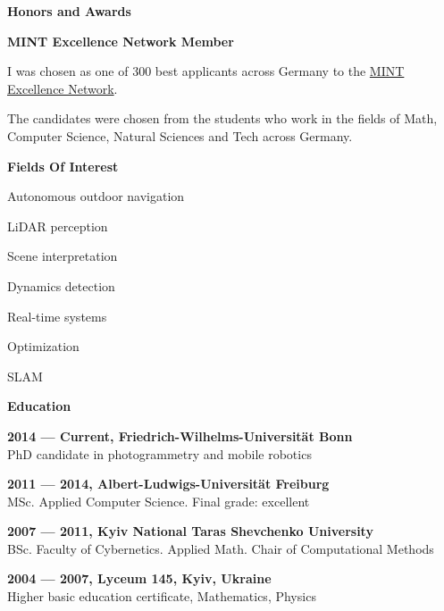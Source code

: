 \documentclass[a4paper,12pt,final]{memoir}
\newcommand{\SmallSep}{\vspace{0.5em}}
\newcommand{\CVSection}[1]
	{\Large\textbf{#1}\par
	\SmallSep\normalsize\normalfont}
\newcommand{\CVItem}[1]
	{\textbf{\color{MidnightBlue} #1}}
\begin{document}
	\CVSection{Honors and Awards}
	\CVItem{MINT Excellence Network Member}
	\begin{compactitem}[\color{MidnightBlue}$\circ$]
		\item I was chosen as one of 300 best applicants across Germany to the
		\href{http://www.mlp.de/#/studenten/karriere/stipendienprogramme/mint-excellence}
		{MINT Excellence Network}.

		The candidates were chosen from the students who work in the fields of Math,
		Computer Science, Natural Sciences and Tech across Germany.
	\end{compactitem}
	\SmallSep{}

	\CVSection{Fields Of Interest}
	\begin{compactitem}[\color{MidnightBlue}$\circ$]
		\item Autonomous outdoor navigation
		\item LiDAR perception
		\item Scene interpretation
		\item Dynamics detection
		\item Real-time systems
		\item Optimization
		\item SLAM
	\end{compactitem}
	\SmallSep

\vfill
\framebreak{}

\CVSection{Education}
\CVItem{2014 --- Current, Friedrich-Wilhelms-Universit\"at Bonn}\\
PhD candidate in photogrammetry and mobile robotics
\SmallSep{}

\CVItem{2011 --- 2014, Albert-Ludwigs-Universit\"at Freiburg}\\
MSc. Applied Computer Science. Final grade: excellent
\SmallSep{}

\CVItem{2007 --- 2011, Kyiv National Taras Shevchenko University}\\
BSc. Faculty of Cybernetics. Applied Math.
\newline Chair of Computational Methods
\SmallSep{}

\CVItem{2004 --- 2007, Lyceum 145, Kyiv, Ukraine}\\
Higher basic education certificate, Mathematics, Physics
\SmallSep{}
\end{document}
